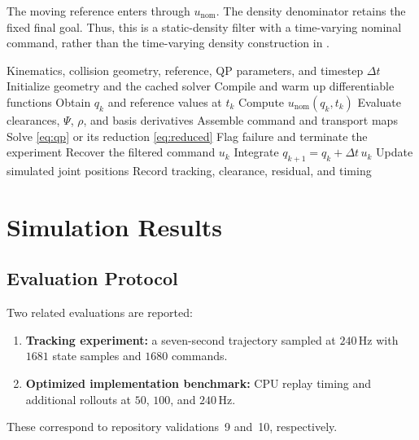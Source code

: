 \documentclass[conference]{IEEEtran}
\begin{document}
The moving reference enters through
$u_{\mathrm{nom}}$. The density denominator
retains the fixed final goal.
Thus, this is a static-density filter with a
time-varying nominal command, rather than the
time-varying density construction in
\cite{narayanan2024dynamic}.

\begin{algorithm}[t]
\caption{Online Density-Based Joint-Velocity Filter}
\label{alg:cdf}
\begin{algorithmic}[1]
\Require Kinematics, collision geometry, reference,
QP parameters, and timestep $\Delta t$
\State Initialize geometry and the cached solver
\State Compile and warm up differentiable functions
    \State Obtain $q_k$ and reference values at $t_k$
    \State Compute $u_{\mathrm{nom}}(q_k,t_k)$
    \State Evaluate clearances, $\Psi$, $\rho$, and basis derivatives
    \State Assemble command and transport maps
    \State Solve \eqref{eq:qp} or its reduction \eqref{eq:reduced}
        \State Flag failure and terminate the experiment
    \EndIf
    \State Recover the filtered command $u_k$
    \State Integrate $q_{k+1}=q_k+\Delta t\,u_k$
    \State Update simulated joint positions
    \State Record tracking, clearance, residual, and timing
\EndFor
\end{algorithmic}
\end{algorithm}

\section{Simulation Results}
\label{sec:results}

\subsection{Evaluation Protocol}

Two related evaluations are reported:
\begin{enumerate}
    \item \textbf{Tracking experiment:}
    a seven-second trajectory sampled at $240$\,Hz
    with $1681$ state samples and $1680$ commands.

    \item \textbf{Optimized implementation benchmark:}
    CPU replay timing and additional rollouts
    at $50$, $100$, and $240$\,Hz.
\end{enumerate}
These correspond to repository validations~9
and~10, respectively.
\end{document}
